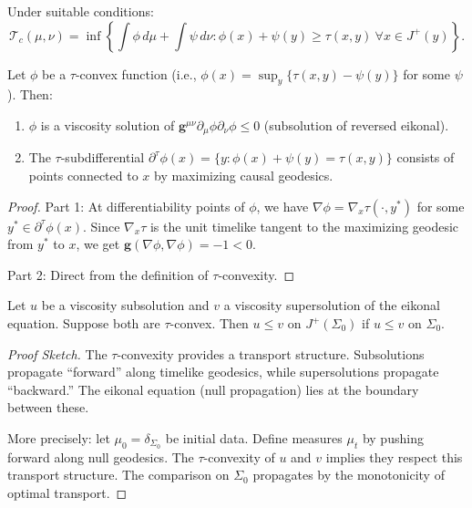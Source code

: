 \begin{theorem}\label{thm:Kantdual}
Under suitable conditions:
\begin{equation}
    \mathcal{T}_c(\mu, \nu) = \inf\left\{\int \phi \, d\mu + \int \psi \, d\nu : \phi(x) + \psi(y) \geq \tau(x, y) \ \forall x \in J^+(y)\right\}.
\end{equation}
\end{theorem}

\begin{proposition}\label{prop:eikonal-OT}
Let $\phi$ be a $\tau$-convex function (i.e., $\phi(x) = \sup_y\{\tau(x, y) - \psi(y)\}$ for some $\psi$). Then:
\begin{enumerate}
    \item $\phi$ is a viscosity solution of $\mathbf{g}^{\mu\nu}\partial_\mu\phi\partial_\nu\phi \leq 0$ (subsolution of reversed eikonal).
    \item The $\tau$-subdifferential $\partial^\tau\phi(x) = \{y : \phi(x) + \psi(y) = \tau(x, y)\}$ consists of points connected to $x$ by maximizing causal geodesics.
\end{enumerate}
\end{proposition}

\begin{proof}
Part 1: At differentiability points of $\phi$, we have $\nabla\phi = \nabla_x\tau(\cdot, y^*)$ for some $y^* \in \partial^\tau\phi(x)$. Since $\nabla_x\tau$ is the unit timelike tangent to the maximizing geodesic from $y^*$ to $x$, we get $\mathbf{g}(\nabla\phi, \nabla\phi) = -1 < 0$.

Part 2: Direct from the definition of $\tau$-convexity.
\end{proof}

\begin{theorem}\label{thm:OT-comparison}
Let $u$ be a viscosity subsolution and $v$ a viscosity supersolution of the eikonal equation. Suppose both are $\tau$-convex. Then $u \leq v$ on $J^+(\Sigma_0)$ if $u \leq v$ on $\Sigma_0$.
\end{theorem}

\begin{proof}[Proof Sketch]
The $\tau$-convexity provides a transport structure. Subsolutions propagate ``forward'' along timelike geodesics, while supersolutions propagate ``backward.'' The eikonal equation (null propagation) lies at the boundary between these.

More precisely: let $\mu_0 = \delta_{\Sigma_0}$ be initial data. Define measures $\mu_t$ by pushing forward along null geodesics. The $\tau$-convexity of $u$ and $v$ implies they respect this transport structure. The comparison on $\Sigma_0$ propagates by the monotonicity of optimal transport.
\end{proof}

